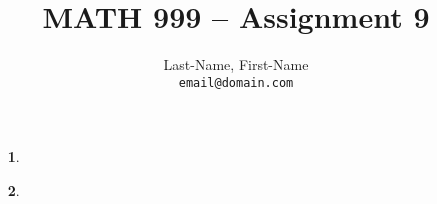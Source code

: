 \newcommand{\preamblefolder}{./include}       %

\usepackage[enable]{easy-todo}                %

\title{MATH 999 -- Assignment 9}
\author{
  Last-Name, First-Name\\
  \texttt{email@domain.com}
}


  \maketitle

    \begin{enumerate}
      \item[\textbf{1}.]
      
        \aspace
      
      \qspace

      \item[\textbf{2}.]
      
        \aspace

      
      
    \end{enumerate}


  \begin{bibdiv}
    \begin{biblist}
    \end{biblist}
  \end{bibdiv}

  \listoftodos


